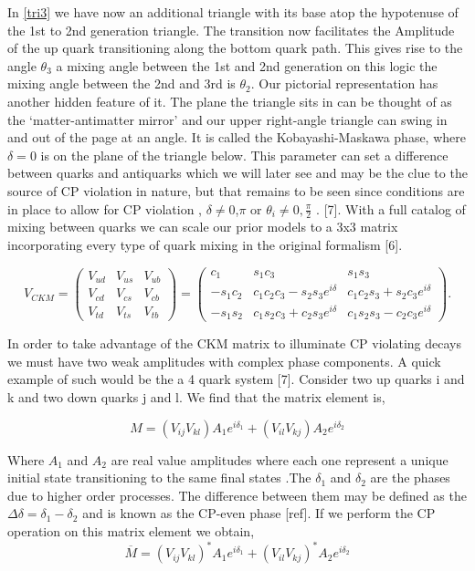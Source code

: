 In \cref{tri3} we have now an additional triangle with its base atop the hypotenuse of the 1st to 2nd generation triangle. The transition now facilitates the Amplitude of the up quark transitioning along the bottom quark path. This gives rise to the angle $\theta_3$ a mixing angle between the 1st and 2nd generation on this logic the mixing angle between the 2nd and 3rd is $\theta_2$. Our pictorial representation has another hidden feature of it. The plane the triangle sits in can be thought of as the ‘matter-antimatter mirror’ and our upper right-angle triangle can swing in and out of the page at an angle. It is called the Kobayashi-Maskawa phase, where $\delta=0$ is on the plane of the triangle below. This parameter can set a difference between quarks and antiquarks which we will later see and may be the clue to the source of CP violation in nature, but that remains to be seen since  conditions are in place to allow for CP violation , $\delta\neq0$,$\pi$ or $\theta_i\neq0,\frac{\pi}{2}$ .  [7].
With a full catalog of mixing between quarks we can scale our prior models to a 3x3 matrix incorporating every type of quark mixing in the original formalism [6]. 

\[V_{CKM} = \left( \begin{array}{ccc} V_{ud} & V_{us} & V_{ub} \\ V_{cd} & V_{cs} & V_{cb} \\ V_{td} & V_{ts} & V_{tb} \end{array}\right) = \left( \begin{array}{ccc} c_1 & s_1 c_3 & s_1 s_3 \\ -s_1 c_2 & c_1 c_2 c_3 -s_2 s_3 e^{i\delta} & c_1 c_2 s_3 + s_2 c_3 e^{i\delta} \\ -s_1 s_2 & c_1 s_2 c_3 +c_2 s_3 e^{i\delta} & c_1 s_2 s_3 - c_2 c_3 e^{i\delta} \end{array} \right). \]

In order to take advantage of the CKM matrix to illuminate CP violating decays we must have two weak amplitudes with complex phase components. A quick example of such would be the a 4 quark system [7]. Consider two up quarks i and k and two down quarks j and l. We find that the matrix element is,

\[M=(V_{ij} V_{kl}) A_1 e^{i \delta_{1}} +(V_{il} V_{kj}) A_2 e^{i\delta_{2}}\] 

Where $A_1$ and $A_2$ are real value amplitudes where each one represent a unique initial state transitioning to the same final states .The $\delta_1$ and $\delta_2$ are the phases due to higher order processes. The difference between them may be defined as the $\Delta\delta = \delta_1 - \delta_2$ and is known as the CP-even phase [ref]. If we perform the CP operation on this matrix element we obtain,
\[\overline{M}=(V_{ij} V_{kl})^* A_1 e^{i\delta_1} +(V_{il} V_{kj})^* A_2 e^{i\delta_2}\]

